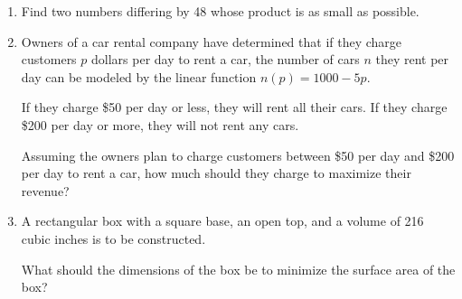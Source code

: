\documentclass[10pt]{article}
\begin{document}
\begin{enumerate}
\newpage%

\item Find two numbers differing by 48 whose product is as small as possible.

\newpage%

\item Owners of a car rental company have determined that if they charge customers $p$ dollars per day to rent a car, the number of cars $n$ they rent per day can be modeled by the linear function $n(p)=1000-5p$.

If they charge \$50 per day or less, they will rent all their cars. If they charge \$200 per day or more, they will not rent any cars. 

Assuming the owners plan to charge customers between \$50 per day and \$200 per day to rent a car, how much should they charge to maximize their revenue?

\newpage%

\item A rectangular box with a square base, an open top, and a volume of 216 cubic inches is to be constructed. 

What should the dimensions of the box be to minimize the surface area of the box?

\end{enumerate}
\end{document}
